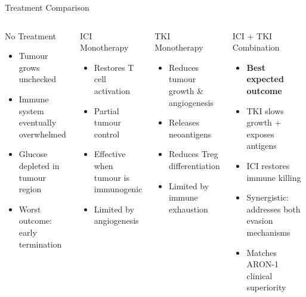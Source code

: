 \documentclass[aspectratio=169,10pt]{beamer}
\begin{document}
\begin{frame}{Treatment Comparison}
  \begin{columns}[T]
    \begin{block}{No Treatment}
      \begin{itemize}
        \item Tumour grows unchecked
        \item Immune system eventually overwhelmed
        \item Glucose depleted in tumour region
        \item Worst outcome: early termination
      \end{itemize}
    \end{block}
    \begin{block}{ICI Monotherapy}
      \begin{itemize}
        \item Restores T cell activation
        \item Partial tumour control
        \item Effective when tumour is immunogenic
        \item Limited by angiogenesis
      \end{itemize}
    \end{block}

    \begin{block}{TKI Monotherapy}
      \begin{itemize}
        \item Reduces tumour growth \& angiogenesis
        \item Releases neoantigens
        \item Reduces Treg differentiation
        \item Limited by immune exhaustion
      \end{itemize}
    \end{block}
    \begin{block}{ICI + TKI Combination}
      \begin{itemize}
        \item \textbf{Best expected outcome}
        \item TKI slows growth + exposes antigens
        \item ICI restores immune killing
        \item Synergistic: addresses both evasion mechanisms
        \item Matches ARON-1 clinical superiority
      \end{itemize}
    \end{block}
  \end{columns}
\end{frame}
\end{document}
